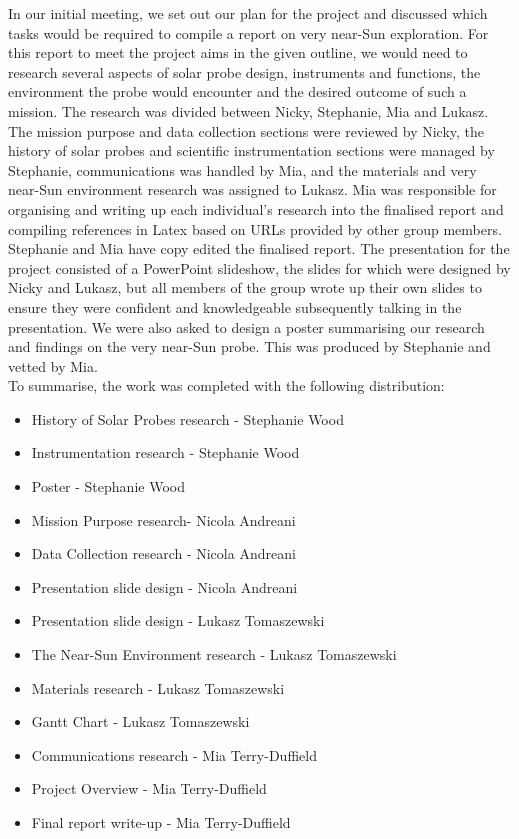 \documentclass[12pt]{article}
\begin{document}
In our initial meeting, we set out our plan for the project and discussed which tasks would be required to compile a report on very near-Sun exploration. For this report to meet the project aims in the given outline, we would need to research several aspects of solar probe design, instruments and functions, the environment the probe would encounter and the desired outcome of such a mission. The research was divided between Nicky, Stephanie, Mia and Lukasz. The mission purpose and data collection sections were reviewed by Nicky, the history of solar probes and scientific instrumentation sections were managed by Stephanie, communications was handled by Mia, and the materials and very near-Sun environment research was assigned to Lukasz. Mia was responsible for organising and writing up each individual's research into the finalised report and compiling references in Latex based on URLs provided by other group members. Stephanie and Mia have copy edited the finalised report. The presentation for the project consisted of a PowerPoint slideshow, the slides for which were designed by Nicky and Lukasz, but all members of the group wrote up their own slides to ensure they were confident and knowledgeable subsequently talking in the presentation. We were also asked to design a poster summarising our research and findings on the very near-Sun probe. This was produced by Stephanie and vetted by Mia. \\

To summarise, the work was completed with the following distribution:

\begin{itemize}
    \item History of Solar Probes research - Stephanie Wood
    \item Instrumentation research - Stephanie Wood
    \item Poster - Stephanie Wood
    
    \item Mission Purpose research- Nicola Andreani
    \item Data Collection research - Nicola Andreani
    \item Presentation slide design - Nicola Andreani
    
    \item Presentation slide design - Lukasz Tomaszewski
    \item The Near-Sun Environment research - Lukasz Tomaszewski
    \item Materials research - Lukasz Tomaszewski
    \item Gantt Chart - Lukasz Tomaszewski
    
    \item Communications research - Mia Terry-Duffield
    \item Project Overview - Mia Terry-Duffield
    \item Final report write-up - Mia Terry-Duffield
    
\end{itemize}
\end{document}
